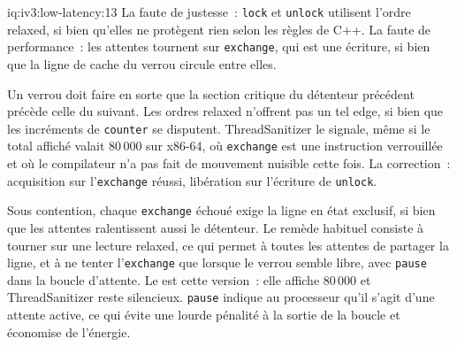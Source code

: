 \begin{solution}{iq:iv3:low-latency:13}
La faute de justesse~: \texttt{lock} et \texttt{unlock} utilisent l'ordre relaxed, si bien qu'elles ne protègent rien selon les règles de C++. La faute de performance~: les attentes tournent sur \texttt{exchange}, qui est une écriture, si bien que la ligne de cache du verrou circule entre elles.

Un verrou doit faire en sorte que la section critique du détenteur précédent précède celle du suivant. Les ordres relaxed n'offrent pas un tel edge, si bien que les incréments de \texttt{counter} se disputent. ThreadSanitizer le signale, même si le total affiché valait 80\,000 sur x86-64, où \texttt{exchange} est une instruction verrouillée et où le compilateur n'a pas fait de mouvement nuisible cette fois. La correction~: acquisition sur l'\texttt{exchange} réussi, libération sur l'écriture de \texttt{unlock}.

Sous contention, chaque \texttt{exchange} échoué exige la ligne en état exclusif, si bien que les attentes ralentissent aussi le détenteur. Le remède habituel consiste à tourner sur une lecture relaxed, ce qui permet à toutes les attentes de partager la ligne, et à ne tenter l'\texttt{exchange} que lorsque le verrou semble libre, avec \texttt{pause} dans la boucle d'attente. Le  est cette version~: elle affiche 80\,000 et ThreadSanitizer reste silencieux. \texttt{pause} indique au processeur qu'il s'agit d'une attente active, ce qui évite une lourde pénalité à la sortie de la boucle et économise de l'énergie.
\label{lst:iv3:ll:ttas}
\end{solution}

